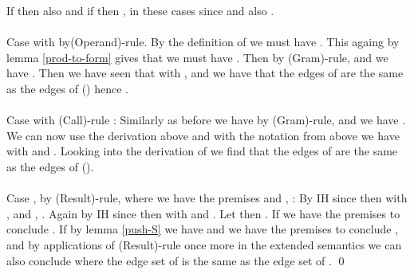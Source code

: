 \documentclass{LMCS}
\newcommand{\eprf}{\qed}
\theoremstyle{definition}\newtheorem{env}[thm]{Environment}
\begin{document}
If  then also  and if  then , in these cases since  and  also . \\
\\
Case  with  by(Operand)-rule. By the definition of  we must have . This againg by lemma \ref{prod-to-form} gives that we must have . Then  by (Gram)-rule, and we have . Then we have seen that  with ,  and we have that the edges of  are the same as the edges of () hence .\\
\\
Case  with (Call)-rule : Similarly as before we have  by (Gram)-rule, and we have . We can now use the derivation above and with the notation from above we have  with  and . Looking into the derivation of  we find that the edges of  are the same as the edges of ().\\
\\
Case ,  by (Result)-rule, where we have the premises  and , : 
By IH since  then  with , and , . Again by IH since  then  with  and . Let  then . If  we have the premises to conclude . If  by lemma \ref{push-S} we have  and we have the premises to conclude , and by applications of (Result)-rule once more in the extended semantics we can also conclude  where the edge set of  is the same as the edge set of .
\eprf



\nocite{*}

\end{document}
